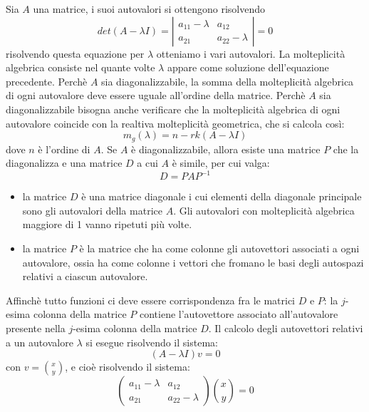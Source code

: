 Sia $A$ una matrice, i suoi autovalori si ottengono risolvendo
\[
    det(A-\lambda I ) = \left| \begin{matrix}
        a_{11} -\lambda & a_{12}\\
        a_{21} & a_{22} - \lambda
    \end{matrix} \right| = 0
\]
risolvendo questa equazione per $\lambda$ otteniamo i vari autovalori.\newline
La molteplicità algebrica consiste nel quante volte $\lambda$ appare come soluzione dell'equazione precedente.\newline
Perchè $A$ sia diagonalizzabile, la somma della molteplicità algebrica di ogni autovalore deve essere uguale all'ordine della matrice.\newline
Perchè $A$ sia diagonalizzabile bisogna anche verificare che la molteplicità algebrica di ogni autovalore coincide con la realtiva molteplicità geometrica, che si calcola così:
\[
    m_g(\lambda) = n - rk(A- \lambda I)
\]
dove $n$ è l'ordine di $A$.\newline
\newline
\newline
Se $A$ è diagonalizzabile, allora esiste una matrice $P$  che la diagonalizza e una matrice $D$ a cui $A$ è simile, per cui valga:
\[
    D = P A P^{-1}
\]
\begin{itemize}
    \item la matrice $D$ è una matrice diagonale i cui elementi della diagonale principale sono gli autovalori della matrice $A$. Gli autovalori con molteplicità algebrica maggiore di 1 vanno ripetuti più volte.
    \item la matrice $P$ è la matrice che ha come colonne gli autovettori associati a ogni autovalore, ossia ha come colonne i vettori che fromano le basi degli autospazi relativi a ciascun autovalore.
\end{itemize}
Affinchè tutto funzioni ci deve essere corrispondenza fra le matrici $D$ e $P$: la $j$-esima colonna della matrice $P$ contiene l'autovettore associato all'autovalore presente nella $j$-esima colonna della matrice $D$.\newline
\newline
Il calcolo degli autovettori relativi a un autovalore $\lambda$ si esegue risolvendo il sistema:
\[
    (A- \lambda I ) v = 0
\]
con $v = \binom{x}{y}$, e cioè risolvendo il sistema:
\[
    \left(\begin{matrix}
        a_{11} -\lambda & a_{12}\\
        a_{21} & a_{22} - \lambda
    \end{matrix} \right) \binom{x}{y} = 0
\]
